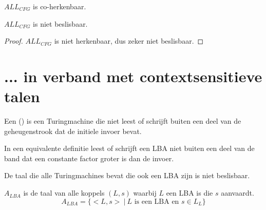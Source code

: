 \documentclass[main.tex]{subfiles}
\begin{document}
\begin{st}
  \label{st:all-cfg-coherk}
  $ALL_{CFG}$ is co-herkenbaar.
\end{st}

\begin{gev}
  \label{gev:all-cfg-niet-besl}
  $ALL_{CFG}$ is niet beslisbaar.

  \begin{proof}
    $ALL_{CFG}$ is niet herkenbaar, dus zeker niet beslisbaar.
  \end{proof}
\end{gev}


\section{... in verband met contextsensitieve talen}
\label{sec:-verb-met-csls}


\begin{de}
  \label{de:linear-begrensde-automaat}
  Een  () is een Turingmachine die niet leest of schrijft buiten een deel van de geheugenstrook dat de initiele invoer bevat.
\end{de}

\begin{st}
  In een equivalente definitie leest of schrijft een LBA niet buiten een deel van de band dat een constante factor groter is dan de invoer.
\zb
\end{st}

\begin{st}
  De taal die alle Turingmachines bevat die ook een LBA zijn is niet beslisbaar.
\end{st}

\begin{de}
  \label{de:a-lba}
  $A_{LBA}$ is de taal van alle koppels $(L,s)$ waarbij $L$ een LBA is die $s$ aanvaardt.
  \[ A_{LBA} = \{ <L,s> \ |\ L \text{ is een LBA en } s \in L_{L}\} \]
\end{de}
\end{document}
